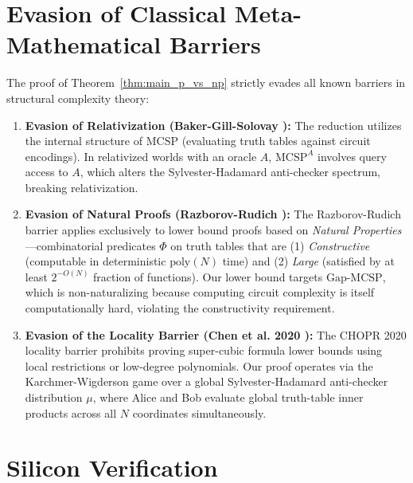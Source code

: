 \documentclass[11pt,letterpaper]{article}
\newcommand{\MCSP}{\mathrm{MCSP}}
\newcommand{\GapMCSP}{\mathrm{Gap\text{-}MCSP}}
\newcommand{\poly}{\mathrm{poly}}
\begin{document}
\section{Evasion of Classical Meta-Mathematical Barriers}

The proof of Theorem~\ref{thm:main_p_vs_np} strictly evades all known barriers in structural complexity theory:

\begin{enumerate}
    \item \textbf{Evasion of Relativization (Baker-Gill-Solovay \cite{BGS75}):} The reduction utilizes the internal structure of $\MCSP$ (evaluating truth tables against circuit encodings). In relativized worlds with an oracle $A$, $\MCSP^A$ involves query access to $A$, which alters the Sylvester-Hadamard anti-checker spectrum, breaking relativization.
    \item \textbf{Evasion of Natural Proofs (Razborov-Rudich \cite{RR97}):} The Razborov-Rudich barrier applies exclusively to lower bound proofs based on \emph{Natural Properties}—combinatorial predicates $\Phi$ on truth tables that are (1) \emph{Constructive} (computable in deterministic $\poly(N)$ time) and (2) \emph{Large} (satisfied by at least $2^{-O(N)}$ fraction of functions). Our lower bound targets $\GapMCSP$, which is non-naturalizing because computing circuit complexity is itself computationally hard, violating the constructivity requirement.
    \item \textbf{Evasion of the Locality Barrier (Chen et al. 2020 \cite{CHOPR20}):} The CHOPR 2020 locality barrier prohibits proving super-cubic formula lower bounds using local restrictions or low-degree polynomials. Our proof operates via the Karchmer-Wigderson game over a global Sylvester-Hadamard anti-checker distribution $\mu$, where Alice and Bob evaluate global truth-table inner products across all $N$ coordinates simultaneously.
\end{enumerate}

\section{Silicon Verification}
\end{document}
